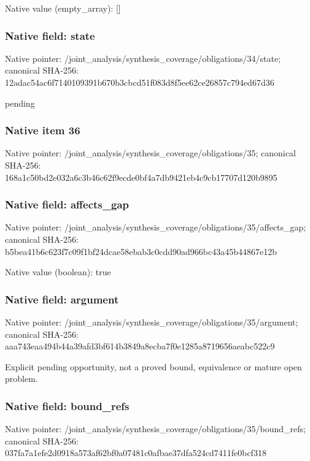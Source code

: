 \documentclass[10pt,a4paper]{article}
\begin{document}
Native value (empty\_\allowbreak{}array): []

\subsubsection{Native field: state}
Native pointer: /joint\_\allowbreak{}analysis/synthesis\_\allowbreak{}coverage/obligations/34/state; canonical SHA-256: 12adac54ac6f7140109391b670b3cbcd51f083d8f5ee62ce26857c794ed67d36

\begingroup\raggedright\sloppy pending\par\endgroup

\subsubsection{Native item 36}
Native pointer: /joint\_\allowbreak{}analysis/synthesis\_\allowbreak{}coverage/obligations/35; canonical SHA-256: 168a1c50bd2e032a6c3b46c62f9ecde0bf4a7db9421eb4c9cb17707d120b9895

\subsubsection{Native field: affects\_\allowbreak{}gap}
Native pointer: /joint\_\allowbreak{}analysis/synthesis\_\allowbreak{}coverage/obligations/35/affects\_\allowbreak{}gap; canonical SHA-256: b5bea41b6c623f7c09f1bf24dcae58ebab3c0cdd90ad966bc43a45b44867e12b

Native value (boolean): true

\subsubsection{Native field: argument}
Native pointer: /joint\_\allowbreak{}analysis/synthesis\_\allowbreak{}coverage/obligations/35/argument; canonical SHA-256: aaa743eaa494b44a39afd3bf614b3849a8ecba7f0e1285a8719656aeabc522c9

\begingroup\raggedright\sloppy Explicit pending opportunity,\allowbreak{} not a proved bound,\allowbreak{} equivalence or mature open problem.\par\endgroup

\subsubsection{Native field: bound\_\allowbreak{}refs}
Native pointer: /joint\_\allowbreak{}analysis/synthesis\_\allowbreak{}coverage/obligations/35/bound\_\allowbreak{}refs; canonical SHA-256: 037fa7a1efe2d0918a573af62bf0a07481c0afbae37dfa524cd7411fe0bcf318
\end{document}
